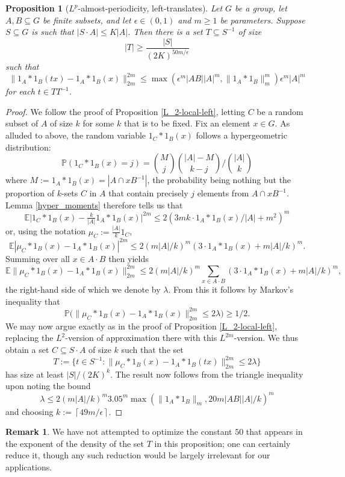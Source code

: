 \documentclass[12pt,a4paper,reqno]{amsart}
\numberwithin{equation}{section}
\theoremstyle{plain}
\newtheorem{proposition}[theorem]{Proposition}
\theoremstyle{definition}
\newtheorem{remark}[theorem]{Remark}
\renewcommand{\leq}{\leqslant}
\renewcommand{\geq}{\geqslant}
\renewcommand{\subset}{\subseteq}
\def\E{\mathbb{E}}
\def\P{\mathbb{P}}
\providecommand{\norm}[1]{\lVert#1\rVert}
\begin{document}
\begin{proposition}[$L^p$-almost-periodicity, left-translates]\label{L_p-local-left}
Let $G$ be a group, let $A, B \subset G$ be finite subsets, and let $\epsilon \in (0,1)$ and $m \geq 1$ be parameters. Suppose $S \subset G$ is such that $|S \cdot A| \leq K|A|$. Then there is a set $T \subset S^{-1}$ of size 
\[ |T| \geq \frac{|S|}{(2K)^{50m/\epsilon}} \]
such that
\[ \norm{ 1_A*1_B(tx) - 1_A*1_B(x) }_{2m}^{2m} \leq \max\left(\epsilon^m |A B| |A|^m, \norm{ 1_A*1_B }_m^m \right) \epsilon^m |A|^m \]
for each $t \in T T^{-1}$.
\end{proposition}
\begin{proof}
We follow the proof of Proposition \ref{L_2-local-left}, letting $C$ be a random subset of $A$ of size $k$ for some $k$ that is to be fixed. Fix an element $x \in G$. As alluded to above, the random variable $1_C*1_B(x)$ follows a hypergeometric distribution:
\[ \P(1_C*1_B(x) = j) = \binom{M}{j}\binom{|A|-M}{k-j}\Big/\binom{|A|}{k} \]
where $M := 1_A*1_B(x) = |A \cap xB^{-1}|$, the probability being nothing but the proportion of $k$-sets $C$ in $A$ that contain precisely $j$ elements from $A \cap xB^{-1}$. Lemma \ref{hyper_moments} therefore tells us that
\[ \E \big| 1_C*1_B(x) - \tfrac{k}{|A|} 1_A*1_B(x) \big|^{2m} \leq 2 \left(3mk\cdot 1_A*1_B(x)/|A| + m^2\right)^m \]
or, using the notation $\mu_C := \frac{|A|}{k} 1_C$,
\[ \E | \mu_C*1_B(x) - 1_A*1_B(x) |^{2m} \leq 2(m |A|/k)^m \left( 3\cdot 1_A*1_B(x) + m |A|/k \right)^m. \]
Summing over all $x \in A \cdot B$ then yields
\[ \E \norm{ \mu_C*1_B(x) - 1_A*1_B(x) }_{2m}^{2m} \leq 2(m |A|/k)^m  \sum_{x \in A \cdot B} \left(3\cdot 1_A*1_B(x) + m |A|/k \right)^m, \]
the right-hand side of which we denote by $\lambda$. From this it follows by Markov's inequality that
\[ \P\big( \norm{ \mu_C*1_B(x) - 1_A*1_B(x) }_{2m}^{2m} \leq 2\lambda \big) \geq 1/2. \]
We may now argue exactly as in the proof of Proposition \ref{L_2-local-left}, replacing the $L^2$-version of approximation there with this $L^{2m}$-version. We thus obtain a set $C \subset S \cdot A$ of size $k$ such that the set
\[ T := \{ t \in S^{-1} : \norm{ \mu_{C}*1_B(x) - 1_A*1_B(tx) }_{2m}^{2m} \leq 2\lambda \} \]
has size at least $|S|/(2K)^k$. The result now follows from the triangle inequality upon noting the bound
\[ \lambda \leq 2(m|A|/k)^m 3.05^m\max\left( \norm{ 1_A*1_B }_m, 20 m |A B| |A|/k \right)^m \]
and choosing $k := \left\lceil 49m/\epsilon \right\rceil$. 
\end{proof}

\begin{remark}
We have not attempted to optimize the constant $50$ that appears in the exponent of the density of the set $T$ in this proposition; one can certainly reduce it, though any such reduction would be largely irrelevant for our applications.
\end{remark}
\end{document}
